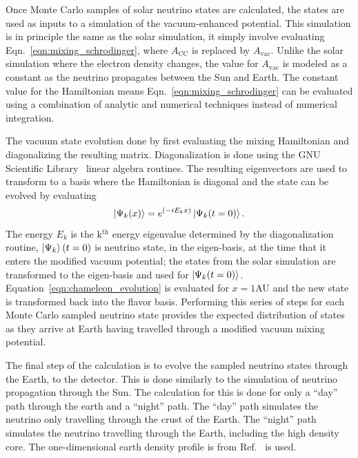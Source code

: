 Once  Monte Carlo samples of solar neutrino states are calculated, the
states are used as inputs to a simulation of the vacuum-enhanced potential.
This simulation is in principle the same as the solar simulation,
it simply involve evaluating Eqn.~\eqref{eqn:mixing_schrodinger}, where 
$A_{\mathrm{CC}}$ is replaced by $A_{\mathrm{vac}}$.
Unlike the solar simulation where the electron density changes,
the value for $A_{\mathrm{vac}}$ is modeled as a constant 
as the neutrino propagates between the Sun and Earth.
The constant value for the Hamiltonian means
Eqn.~\eqref{eqn:mixing_schrodinger} can be evaluated using
a combination of analytic and numerical techniques instead of numerical
integration.

The vacuum state evolution done by first evaluating the mixing
Hamiltonian and diagonalizing the resulting matrix.
Diagonalization is done using the GNU Scientific Library~\cite{gsl_ref}
linear algebra routines.
The resulting eigenvectors are used to transform to a basis where the
Hamiltonian is diagonal and the state can be evolved by evaluating
\begin{equation}
\ket{\Psi_{k}(x)} = e^{(-iE_{k}x)} \ket{\Psi_{k}(t=0)}\text{.}
\label{eqn:chameleon_evolution}
\end{equation}
The energy $E_{k}$ is the k$^{\mathrm{th}}$ energy eigenvalue determined by the
diagonalization routine, $\ket{\Psi_{k}}(t=0)$ is neutrino state, in the eigen-basis, at
the time that it enters the modified vacuum potential;
the states from the solar simulation are transformed to the eigen-basis
and used for $\ket{\Psi_{k}(t=0)}$.
Equation~\eqref{eqn:chameleon_evolution} is evaluated for $x=1$AU
and the new state is transformed back into the flavor basis.
Performing this series of steps for each Monte Carlo sampled neutrino
state provides the expected distribution of states as they arrive at Earth
having travelled through a modified vacuum mixing potential.

The final step of the calculation is to evolve the sampled neutrino states through
the Earth, to the detector.
This is done similarly to the simulation of neutrino propagation through the
Sun.
The calculation for this is done for only a ``day'' path through the earth
and a ``night'' path. The ``day'' path simulates the neutrino only travelling
through the crust of the Earth. The ``night'' path simulates the neutrino
travelling through the Earth, including the high density core.
The one-dimensional earth density profile is from Ref.~\citep{PREM} is used.


